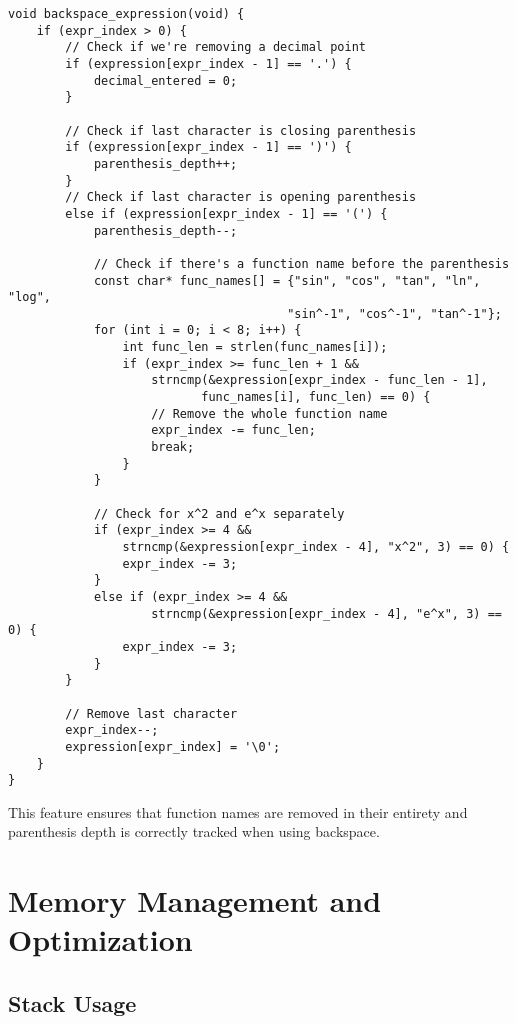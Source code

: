 \documentclass[12pt,a4paper]{article}
\begin{document}
\begin{lstlisting}
void backspace_expression(void) {
    if (expr_index > 0) {
        // Check if we're removing a decimal point
        if (expression[expr_index - 1] == '.') {
            decimal_entered = 0;
        }
        
        // Check if last character is closing parenthesis
        if (expression[expr_index - 1] == ')') {
            parenthesis_depth++;
        }
        // Check if last character is opening parenthesis
        else if (expression[expr_index - 1] == '(') {
            parenthesis_depth--;
            
            // Check if there's a function name before the parenthesis
            const char* func_names[] = {"sin", "cos", "tan", "ln", "log", 
                                       "sin^-1", "cos^-1", "tan^-1"};
            for (int i = 0; i < 8; i++) {
                int func_len = strlen(func_names[i]);
                if (expr_index >= func_len + 1 && 
                    strncmp(&expression[expr_index - func_len - 1], 
                           func_names[i], func_len) == 0) {
                    // Remove the whole function name
                    expr_index -= func_len;
                    break;
                }
            }
            
            // Check for x^2 and e^x separately
            if (expr_index >= 4 && 
                strncmp(&expression[expr_index - 4], "x^2", 3) == 0) {
                expr_index -= 3;
            }
            else if (expr_index >= 4 && 
                    strncmp(&expression[expr_index - 4], "e^x", 3) == 0) {
                expr_index -= 3;
            }
        }
        
        // Remove last character
        expr_index--;
        expression[expr_index] = '\0';
    }
}
\end{lstlisting}

This feature ensures that function names are removed in their entirety and parenthesis depth is correctly tracked when using backspace.

\section{Memory Management and Optimization}

\subsection{Stack Usage}
\end{document}
